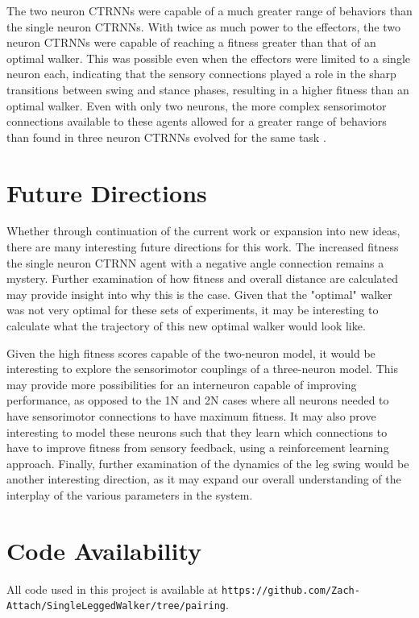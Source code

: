 \documentclass{article}
\begin{document}
The two neuron CTRNNs were capable of a much greater range of behaviors than the single neuron CTRNNs. With twice as much power to the effectors, the two neuron CTRNNs were capable of reaching a fitness greater than that of an optimal walker. This was possible even when the effectors were limited to a single neuron each, indicating that the sensory connections played a role in the sharp transitions between swing and stance phases, resulting in a higher fitness than an optimal walker. Even with only two neurons, the more complex sensorimotor connections available to these agents allowed for a greater range of behaviors than found in three neuron CTRNNs evolved for the same task \cite{BeerWalker}.

\section{Future Directions}
Whether through continuation of the current work or expansion into new ideas, there are many interesting future directions for this work. The increased fitness the single neuron CTRNN agent with a negative angle connection remains a mystery. Further examination of how fitness and overall distance are calculated may provide insight into why this is the case. Given that the "optimal" walker was not very optimal for these sets of experiments, it may be interesting to calculate what the trajectory of this new optimal walker would look like.

Given the high fitness scores capable of the two-neuron model, it would be interesting to explore the sensorimotor couplings of a three-neuron model. This may provide more possibilities for an interneuron capable of improving performance, as opposed to the 1N and 2N cases where all neurons needed to have sensorimotor connections to have maximum fitness. It may also prove interesting to model these neurons such that they learn which connections to have to improve fitness from sensory feedback, using a reinforcement learning approach. Finally, further examination of the dynamics of the leg swing would be another interesting direction, as it may expand our overall understanding of the interplay of the various parameters in the system.



\section{Code Availability}
All code used in this project is available at \texttt{https://github.com/Zach-Attach/SingleLeggedWalker/tree/pairing}.

\pagebreak


\end{document}
